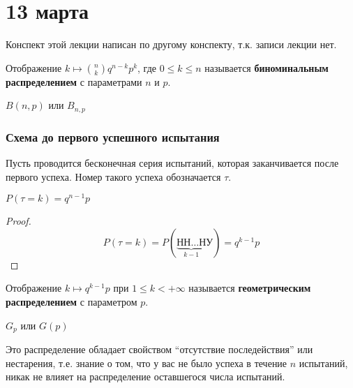\documentclass[12pt, a4paper, oneside]{book}
\begin{document}
\chapter{13 марта}

\begin{remark}
    Конспект этой лекции написан по другому конспекту, т.к. записи лекции нет.
\end{remark}

\begin{definition}
    Отображение \(k \mapsto \binom{n}{k} q^{n - k}p^k\), где \(0 \leq k \leq n\) называется \textbf{биноминальным распределением} с параметрами \(n\) и \(p\).
\end{definition}

\begin{obozn}
    \(B(n,p)\) или \(B_{n, p}\)
\end{obozn}

\subsection{Схема до первого успешного испытания}

Пусть проводится бесконечная серия испытаний, которая заканчивается после первого успеха. Номер такого успеха обозначается \(\tau\).

\begin{theorem}
    \(P(\tau = k) = q^{n - 1}p\)
\end{theorem}
\begin{proof}
    \[P(\tau = k) = P(\underbrace{\text{НН}\dots\text{Н}}_{k - 1}\text{У}) = q^{k-1}p\]
\end{proof}

\begin{definition}
    Отображение \(k \mapsto q^{k - 1}p\) при \(1 \leq k < +\infty\) называется \textbf{геометрическим распределением} с параметром \(p\).
\end{definition}

\begin{obozn}
    \(G_p\) или \(G(p)\)
\end{obozn}

\begin{remark}
    Это распределение обладает свойством ``отсутствие последействия'' или нестарения, т.е. знание о том, что у вас не было успеха в течение \(n\) испытаний, никак не влияет на распределение оставшегося числа испытаний.
\end{remark}
\end{document}
